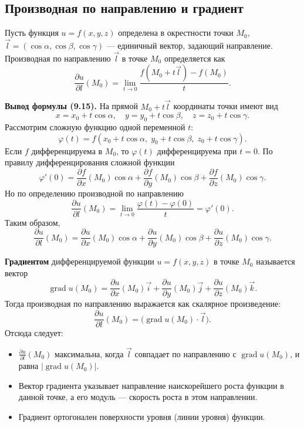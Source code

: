 \documentclass{article}
\theoremstyle{definition}
\begin{document}
\subsection{Производная по направлению и градиент}
Пусть функция $u=f(x,y,z)$ определена в окрестности точки $M_0$, $\vec{l}=(\cos\alpha,\cos\beta,\cos\gamma)$ — единичный вектор, задающий направление. Производная по направлению $\vec{l}$ в точке $M_0$ определяется как
\[
\frac{\partial u}{\partial l}(M_0)=\lim_{t\to0}\frac{f(M_0+t\vec{l})-f(M_0)}{t}.
\]

\textbf{Вывод формулы (9.15).} На прямой $M_0+t\vec{l}$ координаты точки имеют вид
\[
x=x_0+t\cos\alpha,\quad y=y_0+t\cos\beta,\quad z=z_0+t\cos\gamma.
\]
Рассмотрим сложную функцию одной переменной $t$:
\[
\varphi(t)=f(x_0+t\cos\alpha,\;y_0+t\cos\beta,\;z_0+t\cos\gamma).
\]
Если $f$ дифференцируема в $M_0$, то $\varphi(t)$ дифференцируема при $t=0$. По правилу дифференцирования сложной функции
\[
\varphi'(0)=\frac{\partial f}{\partial x}(M_0)\cos\alpha+\frac{\partial f}{\partial y}(M_0)\cos\beta+\frac{\partial f}{\partial z}(M_0)\cos\gamma.
\]
Но по определению производной по направлению
\[
\frac{\partial u}{\partial l}(M_0)=\lim_{t\to0}\frac{\varphi(t)-\varphi(0)}{t}=\varphi'(0).
\]
Таким образом,
\[
\frac{\partial u}{\partial l}(M_0)=\frac{\partial u}{\partial x}(M_0)\cos\alpha+\frac{\partial u}{\partial y}(M_0)\cos\beta+\frac{\partial u}{\partial z}(M_0)\cos\gamma. \tag{9.15}
\]

\textbf{Градиентом} дифференцируемой функции $u=f(x,y,z)$ в точке $M_0$ называется вектор
\[
\operatorname{grad} u(M_0)=\frac{\partial u}{\partial x}(M_0)\vec{i}+\frac{\partial u}{\partial y}(M_0)\vec{j}+\frac{\partial u}{\partial z}(M_0)\vec{k}.
\]
Тогда производная по направлению выражается как скалярное произведение:
\[
\frac{\partial u}{\partial l}(M_0)=\bigl(\operatorname{grad}u(M_0)\cdot\vec{l}\bigr).
\]
Отсюда следует:
\begin{itemize}
    \item $\frac{\partial u}{\partial l}(M_0)$ максимальна, когда $\vec{l}$ совпадает по направлению с $\operatorname{grad}u(M_0)$, и равна $|\operatorname{grad}u(M_0)|$.
    \item Вектор градиента указывает направление наискорейшего роста функции в данной точке, а его модуль — скорость роста в этом направлении.
    \item Градиент ортогонален поверхности уровня (линии уровня) функции.
\end{itemize}
\end{document}
